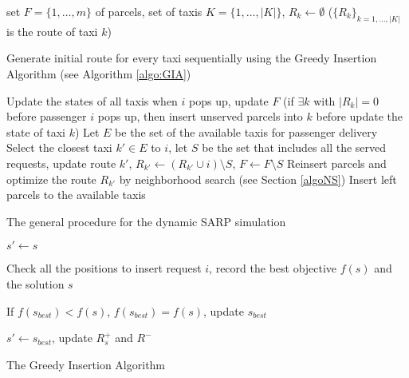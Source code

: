\documentclass[preprint,authoryear,12pt]{elsarticle}
\begin{document}
\begin{algorithm}
\DontPrintSemicolon 

\KwIn
	{set $F = \{1,\ldots,m\}$ of parcels, set of taxis $K =\{1,\ldots,|K|\}$,  $R_k\gets \emptyset$ ($\{R_k\}_{k=1,\ldots,|K|}$ is the route of taxi $k$)}

Generate initial route for every taxi sequentially using the Greedy Insertion Algorithm (see Algorithm \ref{algo:GIA}) 

  {Update the states of all taxis when $i$ pops up, update $F$ (if $\exists k$ with $|R_{k}| = 0$ before passenger $i$ pops up, then insert unserved parcels into $k$ before update the state of taxi $k$)\;
   Let $E$ be the set of the available taxis for passenger delivery\;
   		{
		Select the closest taxi $k'\in E$ to $i$, let $S$ be the set that includes all the served requests, update route $k'$, $R_{k'} \gets (R_{k'} \cup i) \setminus S$, $F \gets F\setminus S$\;
		Reinsert parcels and optimize the route $R_{k'}$ by neighborhood search (see Section \ref{algoNS})\;
		}		
  }		    
   		{
	    Insert left parcels to the available taxis\;
	    }
\caption{The general procedure for the dynamic SARP simulation}
\label{algo:fram}
\end{algorithm}

\begin{algorithm}

$s' \gets s $
	
	{
		{Check all the positions to insert request $i$, record the best objective $f(s)$ and the solution $s$

		If $f(s_{best})<f(s)$, $f(s_{best})=f(s)$, update $s_{best}$
		}
	$s' \gets s_{best}$, update $R_s^+$ and $R^-$

	} 
\caption{The Greedy Insertion Algorithm}
\label{algo:GIA}
\end{algorithm}
\end{document}
